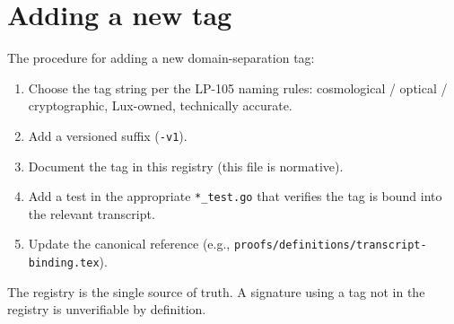 \documentclass[11pt,a4paper]{article}
\begin{document}
\section{Adding a new tag}

The procedure for adding a new domain-separation tag:

\begin{enumerate}[leftmargin=2em,nosep]
  \item Choose the tag string per the LP-105 \cite{lp105} naming rules: cosmological / optical / cryptographic, Lux-owned, technically accurate.
  \item Add a versioned suffix (\texttt{-v1}).
  \item Document the tag in this registry (this file is normative).
  \item Add a test in the appropriate \texttt{*\_test.go} that verifies the tag is bound into the relevant transcript.
  \item Update the canonical reference (e.g., \texttt{proofs/definitions/transcript-binding.tex}).
\end{enumerate}

The registry is the single source of truth. A signature using a tag not in the registry is unverifiable by definition.



\end{document}
